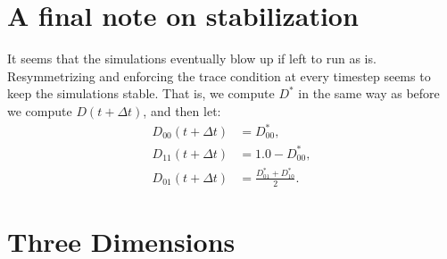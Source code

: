 \documentclass{article}
\begin{document}
\section{A final note on stabilization}

It seems that the simulations eventually blow up if left to run as is. Resymmetrizing and enforcing the trace condition at every timestep seems to keep the simulations stable. That is, we compute $D^*$ in the same way as before we compute $D(t+\Delta t)$, and then let:
\begin{align}
    D_{00}(t+\Delta t) &= D^*_{00}, \\
    D_{11}(t+\Delta t) &= 1.0 - D^*_{00},  \\
    D_{01}(t+\Delta t) &= \frac{D^*_{01} + D^*_{10}}{2}.
\end{align}

\section{Three Dimensions}
\end{document}
